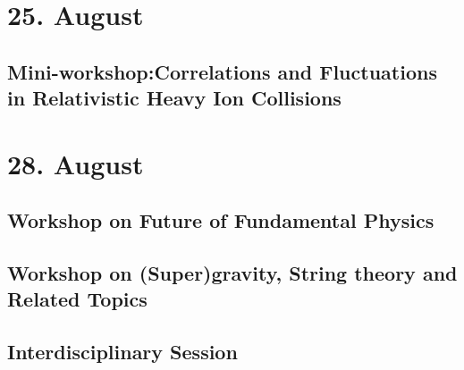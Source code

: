 \section{25. August}
\subsection{Mini-workshop:Correlations and Fluctuations in Relativistic Heavy Ion Collisions}

\clearpage

\section{28. August}
\subsection{Workshop on Future of Fundamental Physics}

\clearpage

\subsection{Workshop on (Super)gravity, String theory and Related Topics}

\clearpage

\subsection{Interdisciplinary Session}

\clearpage



